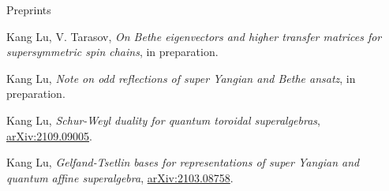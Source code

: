 \documentclass{resume} %
\begin{document}


\begin{rSection}{Preprints}
\begin{etaremune}[leftmargin=0cm]
\item Kang Lu, V. Tarasov, {\it On Bethe eigenvectors and higher transfer matrices for supersymmetric spin
chains}, in preparation.

\item Kang Lu, {\it Note on odd reflections of super Yangian and Bethe ansatz}, in preparation.

\item Kang Lu, {\it Schur-Weyl duality for quantum toroidal superalgebras}, \href{https://arxiv.org/abs/2109.09005}{arXiv:2109.09005}.
\item Kang Lu, {\it Gelfand-Tsetlin bases for representations of super Yangian and quantum affine superalgebra}, \href{https://arxiv.org/abs/2103.08758}{arXiv:2103.08758}.

		
\end{etaremune}
\end{rSection}
\end{document}
